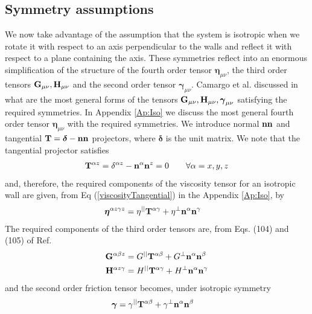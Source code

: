 \documentclass[b5paper,openright,11pt]{book}
\newcommand{\Pendiente}[1]{{\color{green}#1}} %
\begin{document}
\subsection{Symmetry assumptions}
We now take  advantage of the assumption that the  system is isotropic
when we rotate  it with respect to an axis  perpendicular to the walls
and reflect  it with respect  to a  plane containing the  axis.  These
symmetries reflect into an enormous simplification of the structure of
the fourth order tensor  $\boldsymbol{\eta}_{\mu\nu}$, the third order
tensors  ${\bf  G}_{\mu\nu},{\bf  H}_{\mu\nu}$ and  the  second  order
tensor  $\boldsymbol{\gamma}_{\mu\nu}$.   Camargo et al. discussed in
\cite{CamargoBC2018} what are  the most  general forms  of the
tensors                     ${\bf                     G}_{\mu\nu},{\bf
  H}_{\mu\nu},\boldsymbol{\gamma}_{\mu\nu}$  satisfying  the  required
symmetries.  In Appendix \ref{Ap:Iso} we discuss
the most general fourth order tensor $\boldsymbol{\eta}_{\mu\nu}$ with
the required  symmetries.  We  introduce normal  ${\bf n}{\bf  n}$ and
tangential  ${\bf T}=\boldsymbol{\delta}-{\bf  n}{\bf n}$  projectors, where $\boldsymbol{\delta}$ is the unit matrix. 
We note that the tangential projector satisfies
\begin{align}
{\bf  T}^{\alpha  z}=\delta^{\alpha z}-{\bf n}^\alpha{\bf n}^z=0\quad\quad \forall \alpha=x,y,z
\label{T3}
\end{align}
and, therefore, the required components of the viscosity tensor for an
isotropic wall  are given, from Eq  (\ref{viscosityTangential}) in the
Appendix \ref{Ap:Iso}, by
\begin{align}
  \boldsymbol{\eta}^{\alpha z\gamma z}&=  
\eta^{||} {\bf T}^{\alpha\gamma}+\eta^{\bot} {\bf n}^\alpha  {\bf n}^\gamma 
\label{etasimple}
\end{align}
The  required components  of the  third order
tensors are, from  Eqs. \Pendiente{(104) and (105)} of Ref. \cite{CamargoBC2018}
\begin{align}
{\bf G}^{\alpha\beta z}
&=G^{||}{\bf T}^{\alpha\beta}+
G^{\bot}{\bf n}^{\alpha}{\bf n}^{\beta}
\nonumber\\
{\bf H}^{\alpha z\gamma}
&=H^{||}{\bf T}^{\alpha\gamma}+
H^{\bot}{\bf n}^{\alpha}{\bf n}^{\gamma}
\label{GH}
\end{align}
and the second order friction tensor becomes, under
isotropic symmetry 
\begin{align}
\boldsymbol{\gamma}
&=\gamma^{||}{\bf T}^{\alpha\beta}+
\gamma^{\bot}{\bf n}^{\alpha}{\bf n}^{\beta}
\label{gg}
\end{align}
\end{document}
